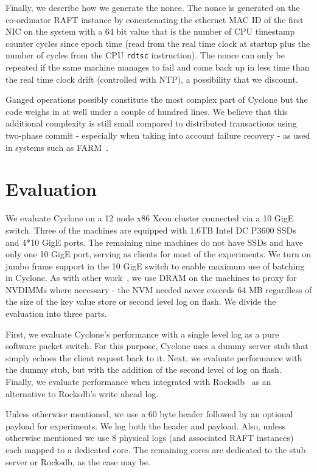 \documentclass[letterpaper,twocolumn,10pt]{article}
\begin{document}
Finally, we describe how we generate the nonce. The nonce is generated on the
co-ordinator RAFT instance by concatenating the ethernet MAC ID of the first NIC
on the system with a 64 bit value that is the number of CPU timestamp counter
cycles since epoch time (read from the real time clock at startup plus the
number of cycles from the CPU {\tt rdtsc} instruction). The nonce can only be
repeated if the same machine manages to fail and come back up in less time than
the real time clock drift (controlled with NTP), a possibility that we discount.

Ganged operations possibly constitute the most complex part of Cyclone but the
code weighs in at well under a couple of hundred lines. We believe that
this additional complexity is still small compared to distributed transactions
using two-phase commit - especially when taking into account failure recovery -
as used in systems such as FARM~\cite{farm}.

\section{Evaluation}
\label{sec:evaluation}
We evaluate Cyclone on a 12 node x86 Xeon cluster connected via a 10 GigE
switch. Three of the machines are equipped with 1.6TB Intel DC P3600 SSDs and
4*10 GigE ports. The remaining nine machines do not have SSDs and have only one
10 GigE port, serving as clients for most of the experiments. We turn on jumbo
frame support in the 10 GigE switch to enable maximum use of batching in
Cyclone. As with other work~\cite{faast}, we use DRAM on the machines to proxy
for NVDIMMs where necessary - the NVM needed never exceeds 64 MB
regardless of the size of the key value store or second level log on flash. We
divide the evaluation into three parts.

First, we evaluate Cyclone's performance with a single level log as a pure
software packet switch. For this purpose, Cyclone uses a dummy server stub that
simply echoes the client request back to it. Next, we evaluate
performance with the dummy stub, but with the addition of the second level of log
on flash. Finally, we evaluate performance when integrated with
Rocksdb~\cite{rocksdb} as an alternative to Rocksdb's write ahead log.

Unless otherwise mentioned, we use a 60 byte header followed by an optional
payload for experiments. We log both the header and payload. Also, unless
otherwise mentioned we use 8 physical logs (and associated RAFT instances) each
mapped to a dedicated core. The remaining cores are dedicated to the stub
server or Rocksdb, as the case may be.
\end{document}
